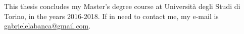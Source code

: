 \documentclass{report}
\begin{document}
\vspace{1.5cm}
This thesis concludes my Master's degree course at Università degli Studi di Torino, in the years 2016-2018. If in need to contact me, my e-mail is \url{gabrielelabanca@gmail.com}.

\tableofcontents







\appendix




\printbibliography
{}
\listoffigures
\end{document}
